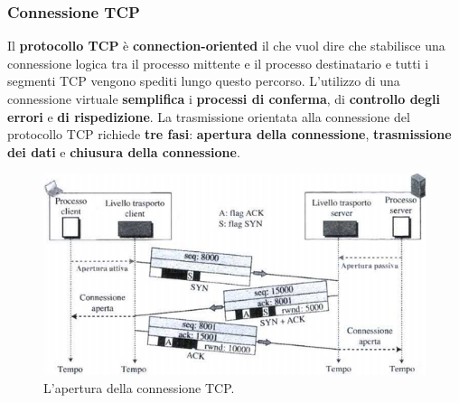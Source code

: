 \documentclass[11pt,a4paper,oneside]{book}
\theoremstyle{definition}
\begin{document}
\subsubsection{Connessione TCP}
Il \textbf{protocollo TCP} è \textbf{connection-oriented} il che vuol dire che stabilisce una connessione logica tra il processo mittente e il processo destinatario e tutti i segmenti TCP vengono spediti lungo questo percorso. L'utilizzo di una connessione virtuale \textbf{semplifica} i \textbf{processi di conferma}, di \textbf{controllo degli errori} e \textbf{di rispedizione}. La trasmissione orientata alla connessione del protocollo TCP richiede \textbf{tre fasi}: \textbf{apertura della connessione}, \textbf{trasmissione dei dati} e \textbf{chiusura della connessione}.
\begin{figure}[!h]
	\includegraphics[scale=0.44]{Immagini/Three_way.png}
	\centering
	\caption{L'apertura della connessione TCP.}
\end{figure}

\pagebreak
\end{document}
